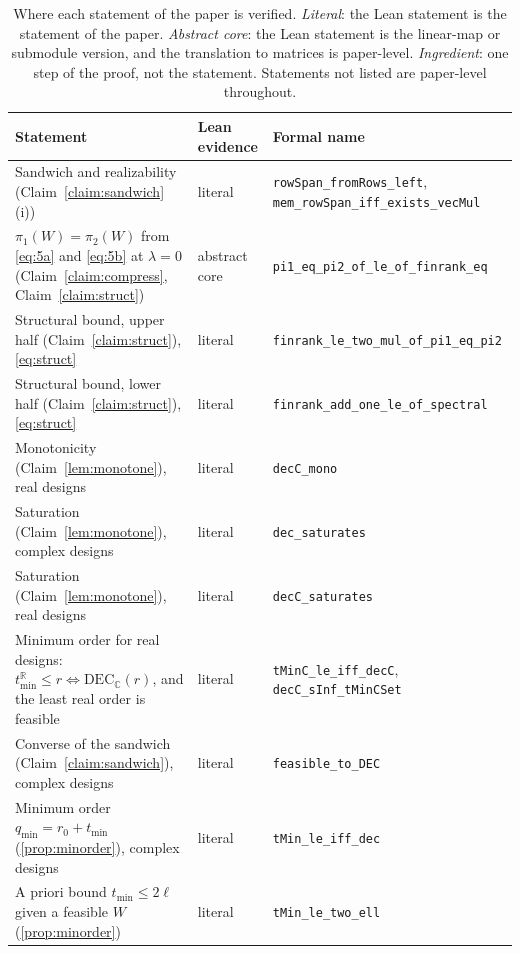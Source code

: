 ﻿\documentclass[journal]{IEEEtran}
\theoremstyle{plainn}
\theoremstyle{remark}
\begin{document}
\begin{table}[!t]
\centering
\caption{Where each statement of the paper is verified. \emph{Literal}: the Lean statement is the
statement of the paper. \emph{Abstract core}: the Lean statement is the linear-map or submodule
version, and the translation to matrices is paper-level. \emph{Ingredient}: one step of the proof,
not the statement. Statements not listed are paper-level throughout.}
\label{tab:evidence}
\footnotesize
\begin{tabular}{@{}p{}>{\raggedright\arraybackslash}p{}>{\raggedright\arraybackslash}p{}@{}}
\toprule
Statement & Lean evidence & Formal name \\
\midrule
Sandwich and realizability (Claim~\ref{claim:sandwich}(i)) & literal &
\texttt{rowSpan\_fromRows\_left}, \texttt{mem\_rowSpan\_iff\_exists\_vecMul} \\
$\pi_1(W)=\pi_2(W)$ from \eqref{eq:5a} and \eqref{eq:5b} at $\lambda=0$
(Claim~\ref{claim:compress}, Claim~\ref{claim:struct}) & abstract core &
\texttt{pi1\_eq\_pi2\_of\_le\_of\_finrank\_eq} \\
Structural bound, upper half (Claim~\ref{claim:struct}), \eqref{eq:struct} & literal &
\texttt{finrank\_le\_two\_mul\_of\_pi1\_eq\_pi2} \\
Structural bound, lower half (Claim~\ref{claim:struct}), \eqref{eq:struct} & literal &
\texttt{finrank\_add\_one\_le\_of\_spectral} \\
Monotonicity (Claim~\ref{lem:monotone}), real designs & literal & \texttt{decC\_mono} \\
Saturation (Claim~\ref{lem:monotone}), complex designs & literal & \texttt{dec\_saturates} \\
Saturation (Claim~\ref{lem:monotone}), real designs & literal & \texttt{decC\_saturates} \\
Minimum order for real designs: $t_{\min}^{\mathbb R}\le r\iff\mathrm{DEC}_{\mathbb C}(r)$, and the least real order is feasible & literal & \texttt{tMinC\_le\_iff\_decC}, \texttt{decC\_sInf\_tMinCSet} \\
Converse of the sandwich (Claim~\ref{claim:sandwich}), complex designs & literal &
\texttt{feasible\_to\_DEC} \\
Minimum order $q_{\min}=r_0+t_{\min}$ (\ref{prop:minorder}), complex designs & literal &
\texttt{tMin\_le\_iff\_dec} \\
A priori bound $t_{\min}\le2\ell$ given a feasible $W$ (\ref{prop:minorder}) & literal &
\texttt{tMin\_le\_two\_ell} \\

\end{tabular}
\end{table}
\end{document}
